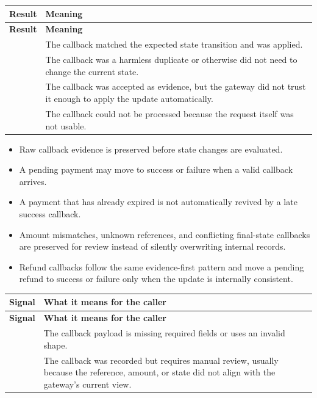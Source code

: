 \begin{longtable}{@{}L{0.22\textwidth}L{0.68\textwidth}@{}}
\toprule
\textbf{Result} & \textbf{Meaning} \\
\midrule
\endfirsthead
\toprule
\textbf{Result} & \textbf{Meaning} \\
\midrule
\endhead
{} & The callback matched the expected state transition and was
applied. \\
\bodyrowrule
{} & The callback was a harmless duplicate or otherwise did not
need to change the current state. \\
\bodyrowrule
{} & The callback was accepted as evidence, but the gateway
did not trust it enough to apply the update automatically. \\
\bodyrowrule
{} & The callback could not be processed because the request itself
was not usable. \\
\bottomrule
\end{longtable}

\begin{itemize}
  \item Raw callback evidence is preserved before state changes are evaluated.
  \item A pending payment may move to success or failure when a valid callback
  arrives.
  \item A payment that has already expired is not automatically revived by a
  late success callback.
  \item Amount mismatches, unknown references, and conflicting final-state
  callbacks are preserved for review instead of silently overwriting internal
  records.
  \item Refund callbacks follow the same evidence-first pattern and move a
  pending refund to success or failure only when the update is internally
  consistent.
\end{itemize}

\begin{longtable}{@{}L{0.28\textwidth}L{0.62\textwidth}@{}}
\toprule
\textbf{Signal} & \textbf{What it means for the caller} \\
\midrule
\endfirsthead
\toprule
\textbf{Signal} & \textbf{What it means for the caller} \\
\midrule
\endhead
{} & The callback payload is missing required fields or
uses an invalid shape. \\
\bodyrowrule
{} & The callback was recorded but requires manual review,
usually because the reference, amount, or state did not align with the gateway's
current view. \\
\bottomrule
\end{longtable}

